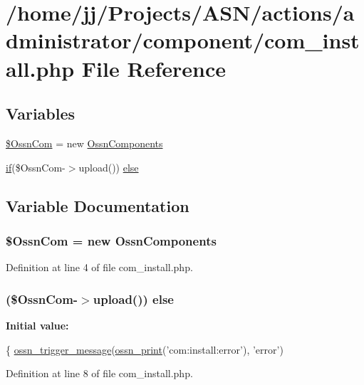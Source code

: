\hypertarget{com__install_8php}{}\section{/home/jj/\+Projects/\+A\+S\+N/actions/administrator/component/com\+\_\+install.php File Reference}
\label{com__install_8php}
\subsection*{Variables}
\begin{DoxyCompactItemize}
\item 
\hyperlink{com__install_8php_a5e3cbe545fe334bc08c7204a94580dce}{\$\+Ossn\+Com} = new \hyperlink{class_ossn_components}{Ossn\+Components}
\item 
\hyperlink{jquery_8tokeninput_8js_ad8dd46a3cbc004569e34401e9e71771a}{if}(\$Ossn\+Com-\/$>$upload()) \hyperlink{com__install_8php_a82cada9440dd454f05dd37197d3eef8d}{else}
\end{DoxyCompactItemize}


\subsection{Variable Documentation}
\subsubsection[{\texorpdfstring{\$\+Ossn\+Com}{$OssnCom}}]{\setlength{\rightskip}{0pt plus 5cm}\$Ossn\+Com = new {\bf Ossn\+Components}}\hypertarget{com__install_8php_a5e3cbe545fe334bc08c7204a94580dce}{}\label{com__install_8php_a5e3cbe545fe334bc08c7204a94580dce}


Definition at line 4 of file com\+\_\+install.\+php.

\subsubsection[{\texorpdfstring{else}{else}}]{ (\$Ossn\+Com-\/$>$upload()) else}\hypertarget{com__install_8php_a82cada9440dd454f05dd37197d3eef8d}{}\label{com__install_8php_a82cada9440dd454f05dd37197d3eef8d}
{\bfseries Initial value\+:}
\begin{DoxyCode}
\{
    \hyperlink{ossn_8lib_8system_8php_ab3f23f23f32f50c12e7aea0ffaccaac7}{ossn\_trigger\_message}(\hyperlink{ossn_8lib_8languages_8php_a2be5d1c4b695593a9b9067b96df2150a}{ossn\_print}(\textcolor{stringliteral}{'com:install:error'}), \textcolor{stringliteral}{'error'})
\end{DoxyCode}


Definition at line 8 of file com\+\_\+install.\+php.

